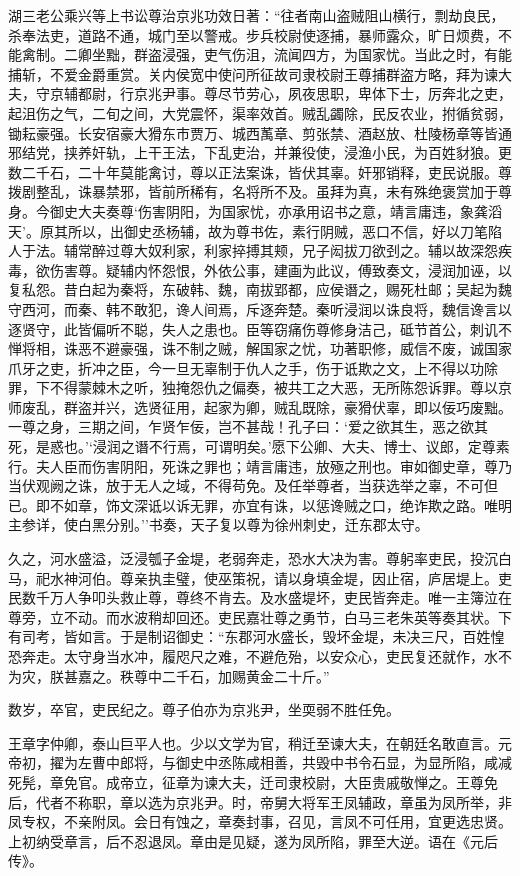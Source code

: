 \documentclass[]{article}
\begin{document}
湖三老公乘兴等上书讼尊治京兆功效日著：``往者南山盗贼阻山横行，剽劫良民，杀奉法吏，道路不通，城门至以警戒。步兵校尉使逐捕，暴师露众，旷日烦费，不能禽制。二卿坐黜，群盗浸强，吏气伤沮，流闻四方，为国家忧。当此之时，有能捕斩，不爱金爵重赏。关内侯宽中使问所征故司隶校尉王尊捕群盗方略，拜为谏大夫，守京辅都尉，行京兆尹事。尊尽节劳心，夙夜思职，卑体下士，厉奔北之吏，起沮伤之气，二旬之间，大党震怀，渠率效首。贼乱蠲除，民反农业，拊循贫弱，锄耘豪强。长安宿豪大猾东市贾万、城西萭章、剪张禁、酒赵放、杜陵杨章等皆通邪结党，挟养奸轨，上干王法，下乱吏治，并兼役使，浸渔小民，为百姓豺狼。更数二千石，二十年莫能禽讨，尊以正法案诛，皆伏其辜。奸邪销释，吏民说服。尊拨剧整乱，诛暴禁邪，皆前所稀有，名将所不及。虽拜为真，未有殊绝褒赏加于尊身。今御史大夫奏尊`伤害阴阳，为国家忧，亦承用诏书之意，靖言庸违，象龚滔天'。原其所以，出御史丞杨辅，故为尊书佐，素行阴贼，恶口不信，好以刀笔陷人于法。辅常醉过尊大奴利家，利家捽搏其颊，兄子闳拔刀欲刭之。辅以故深怨疾毒，欲伤害尊。疑辅内怀怨恨，外依公事，建画为此议，傅致奏文，浸润加诬，以复私怨。昔白起为秦将，东破韩、魏，南拔郢都，应侯谮之，赐死杜邮；吴起为魏守西河，而秦、韩不敢犯，谗人间焉，斥逐奔楚。秦听浸润以诛良将，魏信谗言以逐贤守，此皆偏听不聪，失人之患也。臣等窃痛伤尊修身洁己，砥节首公，刺讥不惮将相，诛恶不避豪强，诛不制之贼，解国家之忧，功著职修，威信不废，诚国家爪牙之吏，折冲之臣，今一旦无辜制于仇人之手，伤于诋欺之文，上不得以功除罪，下不得蒙棘木之听，独掩怨仇之偏奏，被共工之大恶，无所陈怨诉罪。尊以京师废乱，群盗并兴，选贤征用，起家为卿，贼乱既除，豪猾伏辜，即以佞巧废黜。一尊之身，三期之间，乍贤乍佞，岂不甚哉！孔子曰：`爱之欲其生，恶之欲其死，是惑也。'`浸润之谮不行焉，可谓明矣。'愿下公卿、大夫、博士、议郎，定尊素行。夫人臣而伤害阴阳，死诛之罪也；靖言庸违，放殛之刑也。审如御史章，尊乃当伏观阙之诛，放于无人之域，不得苟免。及任举尊者，当获选举之辜，不可但已。即不如章，饰文深诋以诉无罪，亦宜有诛，以惩谗贼之口，绝诈欺之路。唯明主参详，使白黑分别。''书奏，天子复以尊为徐州刺史，迁东郡太守。

久之，河水盛溢，泛浸瓠子金堤，老弱奔走，恐水大决为害。尊躬率吏民，投沉白马，祀水神河伯。尊亲执圭璧，使巫策祝，请以身填金堤，因止宿，庐居堤上。吏民数千万人争叩头救止尊，尊终不肯去。及水盛堤坏，吏民皆奔走。唯一主簿泣在尊旁，立不动。而水波稍却回还。吏民嘉壮尊之勇节，白马三老朱英等奏其状。下有司考，皆如言。于是制诏御史：``东郡河水盛长，毁坏金堤，未决三尺，百姓惶恐奔走。太守身当水冲，履咫尺之难，不避危殆，以安众心，吏民复还就作，水不为灾，朕甚嘉之。秩尊中二千石，加赐黄金二十斤。''

数岁，卒官，吏民纪之。尊子伯亦为京兆尹，坐耎弱不胜任免。

王章字仲卿，泰山巨平人也。少以文学为官，稍迁至谏大夫，在朝廷名敢直言。元帝初，擢为左曹中郎将，与御史中丞陈咸相善，共毁中书令石显，为显所陷，咸减死髡，章免官。成帝立，征章为谏大夫，迁司隶校尉，大臣贵戚敬惮之。王尊免后，代者不称职，章以选为京兆尹。时，帝舅大将军王凤辅政，章虽为凤所举，非凤专权，不亲附凤。会日有蚀之，章奏封事，召见，言凤不可任用，宜更选忠贤。上初纳受章言，后不忍退凤。章由是见疑，遂为凤所陷，罪至大逆。语在《元后传》。
\end{document}
